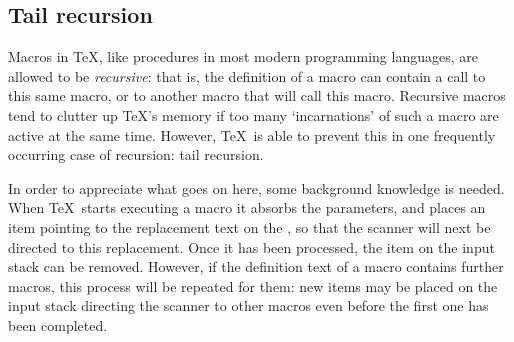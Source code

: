 \subsection{Tail recursion}

Macros in \TeX, like procedures in most modern programming
languages, are allowed to be \emph{recursive}: that is, the 
definition of a macro can contain a call to this same macro,
or to another macro that will call this macro.
Recursive macros tend to clutter up \TeX's memory
if too many `incarnations' of such a macro are active
at the same time. However, \TeX\ is able to prevent this
in one frequently occurring case of recursion: tail recursion.

In order to  appreciate what goes on here, some background
knowledge is needed. When \TeX\ starts executing a macro
it absorbs the parameters, and places an item pointing to
the replacement text on the ,
so that the scanner will next be directed to
this replacement. Once it has been processed, the item on the 
input stack can be removed.
However, if the definition text
of a macro contains further macros, this process will be
repeated for them: new items may be placed on the input stack
directing the scanner to other macros
even before the first one has been completed.

